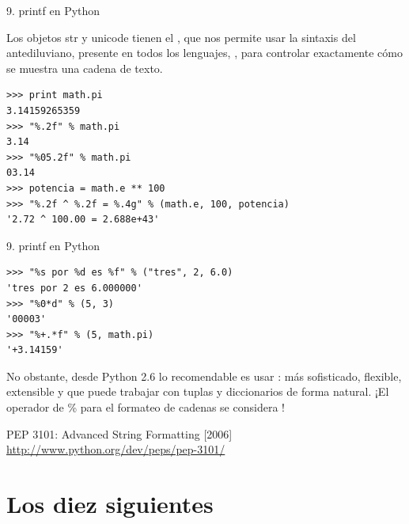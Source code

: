 \documentclass[14pt]{beamer}
\begin{document}
\begin{frame}[fragile]{9. printf en Python}
  \small
  \begin{block}{}
    \centering
    Los objetos str y unicode tienen el , que
    nos permite usar la sintaxis del antediluviano, presente en todos
    los lenguajes, , para controlar exactamente
    cómo se muestra una cadena de texto.
  \end{block}

  \footnotesize
  \begin{exampleblock}{}
    \begin{lstlisting}
>>> print math.pi
3.14159265359
>>> "%.2f" % math.pi
3.14
>>> "%05.2f" % math.pi
03.14
>>> potencia = math.e ** 100
>>> "%.2f ^ %.2f = %.4g" % (math.e, 100, potencia)
'2.72 ^ 100.00 = 2.688e+43'
    \end{lstlisting}
  \end{exampleblock}
\end{frame}

\begin{frame}[fragile]{9. printf en Python}
  \footnotesize
  \begin{exampleblock}{}
    \begin{lstlisting}
>>> "%s por %d es %f" % ("tres", 2, 6.0)
'tres por 2 es 6.000000'
>>> "%0*d" % (5, 3)
'00003'
>>> "%+.*f" % (5, math.pi)
'+3.14159'
    \end{lstlisting}
  \end{exampleblock}

  \begin{alertblock}{}
    \centering
    \small
    No obstante, desde Python 2.6 lo recomendable es usar
    : más sofisticado, flexible, extensible y
    que puede trabajar con tuplas y diccionarios de forma natural. ¡El
    operador de \% para el formateo de cadenas se considera
    !
  \end{alertblock}

  \begin{block}
    {\centering PEP 3101: Advanced String Formatting [2006]}
    \centering \url{http://www.python.org/dev/peps/pep-3101/}
  \end{block}
\end{frame}

\section{Los diez siguientes}
\end{document}
